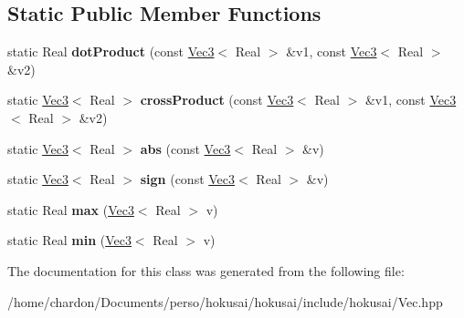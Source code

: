 \subsection*{Static Public Member Functions}
\begin{DoxyCompactItemize}
\item 
\hypertarget{classhokusai_1_1Vec3_af0140406a51c7d0850979474628bf5fb}{static Real {\bfseries dot\+Product} (const \hyperlink{classhokusai_1_1Vec3}{Vec3}$<$ Real $>$ \&v1, const \hyperlink{classhokusai_1_1Vec3}{Vec3}$<$ Real $>$ \&v2)}\label{classhokusai_1_1Vec3_af0140406a51c7d0850979474628bf5fb}

\item 
\hypertarget{classhokusai_1_1Vec3_a5f53008bac33863beede32a188b2af3b}{static \hyperlink{classhokusai_1_1Vec3}{Vec3}$<$ Real $>$ {\bfseries cross\+Product} (const \hyperlink{classhokusai_1_1Vec3}{Vec3}$<$ Real $>$ \&v1, const \hyperlink{classhokusai_1_1Vec3}{Vec3}$<$ Real $>$ \&v2)}\label{classhokusai_1_1Vec3_a5f53008bac33863beede32a188b2af3b}

\item 
\hypertarget{classhokusai_1_1Vec3_ad36d4353112b56a967a1257423d5b78f}{static \hyperlink{classhokusai_1_1Vec3}{Vec3}$<$ Real $>$ {\bfseries abs} (const \hyperlink{classhokusai_1_1Vec3}{Vec3}$<$ Real $>$ \&v)}\label{classhokusai_1_1Vec3_ad36d4353112b56a967a1257423d5b78f}

\item 
\hypertarget{classhokusai_1_1Vec3_ac86306be39a800bbd72bf24fe94119c1}{static \hyperlink{classhokusai_1_1Vec3}{Vec3}$<$ Real $>$ {\bfseries sign} (const \hyperlink{classhokusai_1_1Vec3}{Vec3}$<$ Real $>$ \&v)}\label{classhokusai_1_1Vec3_ac86306be39a800bbd72bf24fe94119c1}

\item 
\hypertarget{classhokusai_1_1Vec3_a690c4a4cb590fcc58939907e2864f1de}{static Real {\bfseries max} (\hyperlink{classhokusai_1_1Vec3}{Vec3}$<$ Real $>$ v)}\label{classhokusai_1_1Vec3_a690c4a4cb590fcc58939907e2864f1de}

\item 
\hypertarget{classhokusai_1_1Vec3_a98152ebf6ff1c6d450e5fe32b3fcb34d}{static Real {\bfseries min} (\hyperlink{classhokusai_1_1Vec3}{Vec3}$<$ Real $>$ v)}\label{classhokusai_1_1Vec3_a98152ebf6ff1c6d450e5fe32b3fcb34d}

\end{DoxyCompactItemize}


The documentation for this class was generated from the following file\+:\begin{DoxyCompactItemize}
\item 
/home/chardon/\+Documents/perso/hokusai/hokusai/include/hokusai/Vec.\+hpp\end{DoxyCompactItemize}
